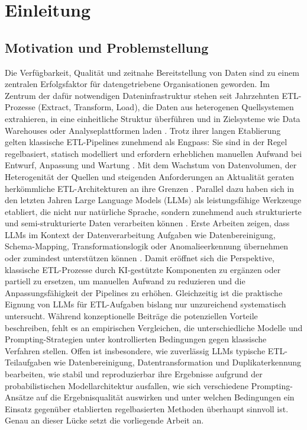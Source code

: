 
\chapter{Einleitung}
\label{ch:einleitung}


\section{Motivation und Problemstellung}
\label{subsec:motivation}

Die Verfügbarkeit, Qualität und zeitnahe Bereitstellung von Daten sind zu einem zentralen Erfolgsfaktor für datengetriebene Organisationen geworden. Im Zentrum der dafür notwendigen Dateninfrastruktur stehen seit Jahrzehnten ETL-Prozesse (Extract, Transform, Load), die Daten aus heterogenen Quellsystemen extrahieren, in eine einheitliche Struktur überführen und in Zielsysteme wie Data Warehouses oder Analyseplattformen laden \autocite{khanOverviewETLTechniques2024,walhaDataIntegrationTraditional2024}. Trotz ihrer langen Etablierung gelten klassische ETL-Pipelines zunehmend als Engpass: Sie sind in der Regel regelbasiert, statisch modelliert und erfordern erheblichen manuellen Aufwand bei Entwurf, Anpassung und Wartung \autocite{mishraAutomatingDataIntegration2020,nagabhyruBridgingTraditionalETL2022}. Mit dem Wachstum von Datenvolumen, der Heterogenität der Quellen und steigenden Anforderungen an Aktualität geraten herkömmliche ETL-Architekturen an ihre Grenzen \autocite{walhaDataIntegrationTraditional2024,raviETLExtractTransform2025}.
Parallel dazu haben sich in den letzten Jahren Large Language Models (LLMs) als leistungsfähige Werkzeuge etabliert, die nicht nur natürliche Sprache, sondern zunehmend auch strukturierte und semi-strukturierte Daten verarbeiten können \autocite{zhaoSurveyLargeLanguage2026}. Erste Arbeiten zeigen, dass LLMs im Kontext der Datenverarbeitung Aufgaben wie Datenbereinigung, Schema-Mapping, Transformationslogik oder Anomalieerkennung übernehmen oder zumindest unterstützen können \autocite{hassaniRoleChatGPTData2023,chakrabortyETLHowAI2025,khanLeveragingArtificialIntelligence2025}. Damit eröffnet sich die Perspektive, klassische ETL-Prozesse durch KI-gestützte Komponenten zu ergänzen oder partiell zu ersetzen, um manuellen Aufwand zu reduzieren und die Anpassungsfähigkeit der Pipelines zu erhöhen.
Gleichzeitig ist die praktische Eignung von LLMs für ETL-Aufgaben bislang nur unzureichend systematisch untersucht. Während konzeptionelle Beiträge die potenziellen Vorteile beschreiben, fehlt es an empirischen Vergleichen, die unterschiedliche Modelle und Prompting-Strategien unter kontrollierten Bedingungen gegen klassische Verfahren stellen. Offen ist insbesondere, wie zuverlässig LLMs typische ETL-Teilaufgaben wie Datenbereinigung, Datentransformation und Duplikaterkennung bearbeiten, wie stabil und reproduzierbar ihre Ergebnisse aufgrund der probabilistischen Modellarchitektur ausfallen, wie sich verschiedene Prompting-Ansätze auf die Ergebnisqualität auswirken und unter welchen Bedingungen ein Einsatz gegenüber etablierten regelbasierten Methoden überhaupt sinnvoll ist. Genau an dieser Lücke setzt die vorliegende Arbeit an.
